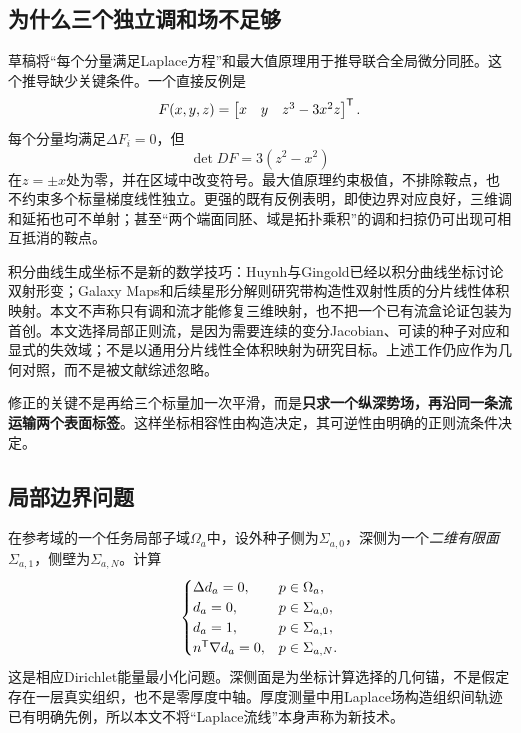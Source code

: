 \documentclass[UTF8,11pt,a4paper,fontset=fandol]{ctexart}
\numberwithin{equation}{section}
\theoremstyle{plain}
\theoremstyle{definition}
\theoremstyle{remark}
\begin{document}
\subsection{为什么三个独立调和场不足够}
草稿将“每个分量满足Laplace方程”和最大值原理用于推导联合全局微分同胚\cite{UserDraft}。这个推导缺少关键条件。一个直接反例是
\begin{equation}
 F(x,y,z)=\begin{bmatrix}x&y&z^3-3x^2z\end{bmatrix}^{\mathsf T}.
 \label{eq:harmonic-counterexample}
\end{equation}
每个分量均满足$\Delta F_i=0$，但
\begin{equation}
 \det DF=3(z^2-x^2)
\end{equation}
在$z=\pm x$处为零，并在区域中改变符号。最大值原理约束极值，不排除鞍点，也不约束多个标量梯度线性独立。更强的既有反例表明，即使边界对应良好，三维调和延拓也可不单射\cite{Laugesen1996}；甚至“两个端面同胚、域是拓扑乘积”的调和扫掠仍可出现可相互抵消的鞍点\cite{Goates2025}。

积分曲线生成坐标不是新的数学技巧：Huynh与Gingold已经以积分曲线坐标讨论双射形变；Galaxy Maps和后续星形分解则研究带构造性双射性质的分片线性体积映射\cite{Huynh2015,Hinderink2023,Hinderink2024}。本文不声称只有调和流才能修复三维映射，也不把一个已有流盒论证包装为首创。本文选择局部正则流，是因为需要连续的变分Jacobian、可读的种子对应和显式的失效域；不是以通用分片线性全体积映射为研究目标。上述工作仍应作为几何对照，而不是被文献综述忽略。

修正的关键不是再给三个标量加一次平滑，而是\textbf{只求一个纵深势场，再沿同一条流运输两个表面标签}。这样坐标相容性由构造决定，其可逆性由明确的正则流条件决定。

\subsection{局部边界问题}
在参考域的一个任务局部子域$\Omega_a$中，设外种子侧为$\Sigma_{a,0}$，深侧为一个\emph{二维有限面}$\Sigma_{a,1}$，侧壁为$\Sigma_{a,N}$。计算
\begin{equation}
\begin{cases}
 \Delta d_a=0,&p\in\Omega_a,\\
 d_a=0,&p\in\Sigma_{a,0},\\
 d_a=1,&p\in\Sigma_{a,1},\\
 n^{\mathsf T}\nabla d_a=0,&p\in\Sigma_{a,N}.
\end{cases}
\label{eq:depth-pde}
\end{equation}
这是相应Dirichlet能量最小化问题。深侧面是为坐标计算选择的几何锚，不是假定存在一层真实组织，也不是零厚度中轴。厚度测量中用Laplace场构造组织间轨迹已有明确先例\cite{Jones2000,Yezzi2003}，所以本文不将“Laplace流线”本身声称为新技术。
\end{document}
